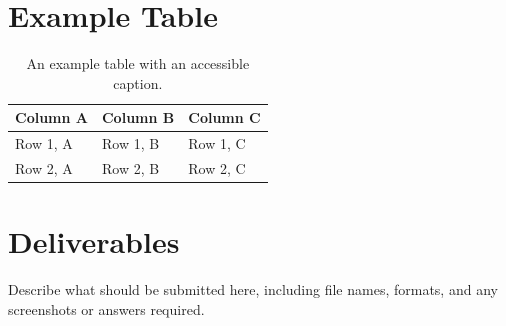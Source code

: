 \documentclass[12pt]{article}
\begin{document}
\section*{Example Table}

\begin{table}[h]
    \centering
    \caption{An example table with an accessible caption.}
    \begin{tabular}{|l|l|l|}
        \hline
        \textbf{Column A} & \textbf{Column B} & \textbf{Column C} \\
        \hline
        Row 1, A & Row 1, B & Row 1, C \\
        Row 2, A & Row 2, B & Row 2, C \\
        \hline
    \end{tabular}
    \label{tab:example}
\end{table}


%
%


\section*{Deliverables}

Describe what should be submitted here, including file names, formats, and
any screenshots or answers required.
\end{document}
